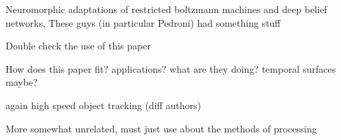 
Neuromorphic adaptations of restricted boltzmann machines and deep belief networks, These guys (in particular Pedroni) had something stuff \cite{pedroni2013neuromorphic}


Double check the use of this paper \cite{gil2014active}

How does this paper fit? applications? what are they doing? temporal surfaces maybe? \cite{davide2014high}

again high speed object tracking (diff authors) \cite{saner2014high} 

More somewhat unrelated, must just use about the methods of processing \cite{mueggler2015continuous}
